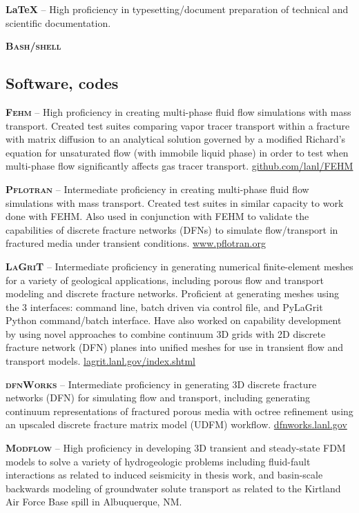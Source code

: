 \documentclass[11pt, letterpaper]{article}
\begin{document}
\textbf{\LaTeX} -- High proficiency in typesetting/document preparation of technical and
scientific documentation.

\textbf{\textsc{Bash/shell}}

\subsection*{Software, codes}
\noindent
\textbf{\textsc{Fehm}} -- High proficiency in creating multi-phase fluid flow simulations
with mass transport. Created test suites comparing vapor tracer transport
within a fracture with matrix diffusion to an analytical solution governed by a
modified Richard's equation for unsaturated flow (with immobile liquid phase)
in order to test when multi-phase flow significantly affects gas tracer
transport. \href{https://github.com/lanl/FEHM}{github.com/lanl/FEHM}

\textbf{\textsc{Pflotran}} -- Intermediate proficiency in creating multi-phase fluid flow
simulations with mass transport. Created test suites in similar capacity to
work done with FEHM. Also used in conjunction with FEHM to validate the
capabilities of discrete fracture networks (DFNs) to simulate flow/transport in
fractured media under transient conditions.
\href{https://www.pflotran.org}{www.pflotran.org} 

\textbf{\textsc{LaGriT}} -- Intermediate proficiency in generating numerical
finite-element meshes for a variety of geological applications, including
porous flow and transport modeling and discrete fracture networks. Proficient
at generating meshes using the 3 interfaces: command line, batch driven via
control file, and PyLaGrit Python command/batch interface. Have also worked on
capability development by using novel approaches to combine continuum 3D grids
with 2D discrete fracture network (DFN) planes into unified meshes for use in
transient flow and transport models.
\href{https://lagrit.lanl.gov/index.shtml}{lagrit.lanl.gov/index.shtml}

\textbf{\textsc{dfnWorks}} -- Intermediate proficiency in generating 3D discrete fracture
networks (DFN) for simulating flow and transport, including generating
continuum representations of fractured porous media with octree refinement
using an upscaled discrete fracture matrix model (UDFM) workflow.
\href{https://dfnworks.lanl.gov}{dfnworks.lanl.gov}

\textbf{\textsc{Modflow}} -- High proficiency in developing 3D transient and steady-state
FDM models to solve a variety of hydrogeologic problems including fluid-fault
interactions as related to induced seismicity in thesis work, and basin-scale
backwards modeling of groundwater solute transport as related to the Kirtland
Air Force Base spill in Albuquerque, NM.
\end{document}
